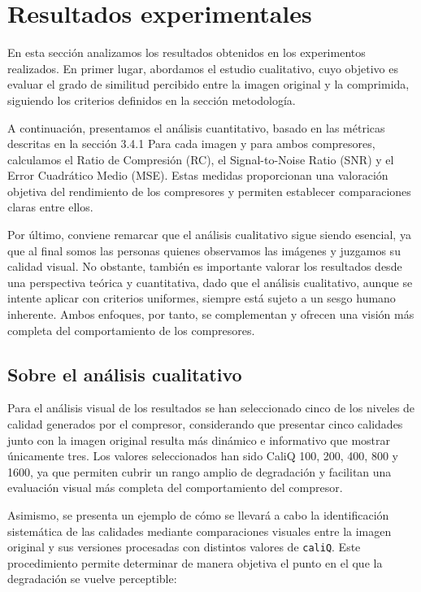 \documentclass[a4paper, 12pt]{article}
\begin{document}
 



\section{Resultados experimentales}
En esta sección analizamos los resultados obtenidos en los experimentos realizados. En primer lugar, abordamos el estudio cualitativo, cuyo objetivo es evaluar el grado de similitud percibido entre la imagen original y la comprimida, siguiendo los criterios definidos en la sección metodología.

A continuación, presentamos el análisis cuantitativo, basado en las métricas descritas en la sección 3.4.1 Para cada imagen y para ambos compresores, calculamos el Ratio de Compresión (RC), el Signal-to-Noise Ratio (SNR) y el Error Cuadrático Medio (MSE). Estas medidas proporcionan una valoración objetiva del rendimiento de los compresores y permiten establecer comparaciones claras entre ellos.

Por último, conviene remarcar que el análisis cualitativo sigue siendo esencial, ya que al final somos las personas quienes observamos las imágenes y juzgamos su calidad visual. No obstante, también es importante valorar los resultados desde una perspectiva teórica y cuantitativa, dado que el análisis cualitativo, aunque se intente aplicar con criterios uniformes, siempre está sujeto a un sesgo humano inherente. Ambos enfoques, por tanto, se complementan y ofrecen una visión más completa del comportamiento de los compresores.
\subsection{Sobre el análisis cualitativo}
Para el análisis visual de los resultados se han seleccionado cinco de los niveles de calidad generados por el compresor, considerando que presentar cinco calidades junto con la imagen original resulta más dinámico e informativo que mostrar únicamente tres. Los valores seleccionados han sido CaliQ 100, 200, 400, 800 y 1600, ya que permiten cubrir un rango amplio de degradación y facilitan una evaluación visual más completa del comportamiento del compresor.

Asimismo, se presenta un ejemplo de cómo se llevará a cabo la identificación sistemática de las calidades mediante comparaciones visuales entre la imagen original y sus versiones procesadas con distintos valores de \texttt{caliQ}. Este procedimiento permite determinar de manera objetiva el punto en el que la degradación se vuelve perceptible:
\end{document}
